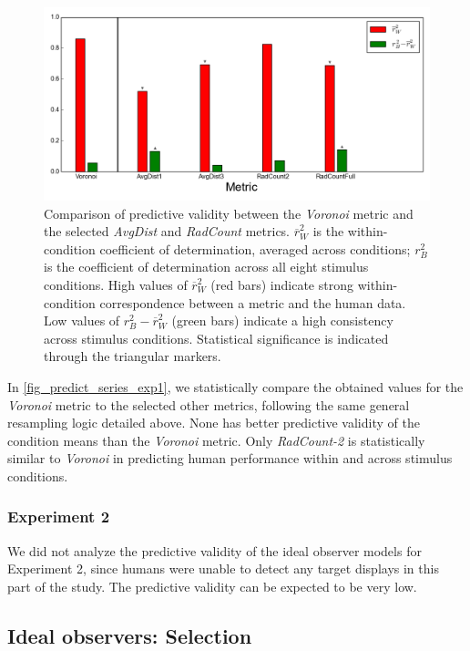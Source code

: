 \documentclass[12pt]{article}
\begin{document}
\begin{figure}
\includegraphics{Figures/FIG_predict_series_exp1.png}
\caption{Comparison of predictive validity between the \emph{Voronoi} metric and the selected \emph{AvgDist} and \emph{RadCount} metrics. $\overline{r}^{2}_W$ is the within-condition coefficient of determination, averaged across conditions; $r^{2}_B$ is the coefficient of determination across all eight stimulus conditions. High values of $\overline{r}^{2}_W$ (red bars) indicate strong within-condition correspondence between a metric and the human data. Low values of $r^{2}_B -\overline{r}^{2}_W$ (green bars) indicate a high consistency across stimulus conditions. Statistical significance is indicated through the triangular markers.}
\label{fig_predict_series_exp1}
\end{figure}

In \autoref{fig_predict_series_exp1}, we statistically compare the obtained values for the \emph{Voronoi} metric to the selected other metrics, following the same general resampling logic detailed above. None has better predictive validity of the condition means than the \emph{Voronoi} metric. Only \emph{RadCount-2} is statistically similar to \emph{Voronoi} in predicting human performance within and across stimulus conditions.

\subsubsection{Experiment 2}
We did not analyze the predictive validity of the ideal observer models for Experiment 2, since humans were unable to detect any target displays in this part of the study. The predictive validity can be expected to be very low.


\subsection{Ideal observers: Selection}\label{subsection_results_select}
\end{document}
